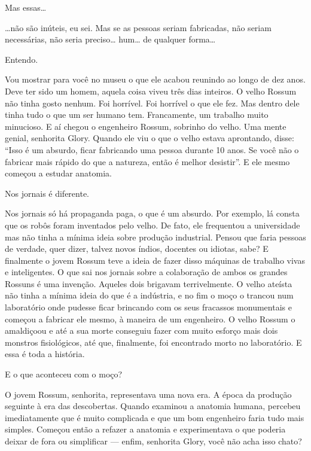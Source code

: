  Mas essas\ldots{}

 \ldots{}não são inúteis, eu sei. Mas se as pessoas seriam fabricadas, não
seriam necessárias, não seria preciso\ldots{} hum\ldots{} de qualquer forma\ldots{}

 Entendo.

 Vou mostrar para você no museu o que ele acabou reunindo ao longo de
dez anos. Deve ter sido um homem, aquela coisa viveu três dias inteiros. O velho
Rossum não tinha gosto nenhum. Foi horrível. Foi horrível o que ele fez. Mas
dentro dele tinha tudo o que um ser humano tem. Francamente, um trabalho
muito minucioso. E aí chegou o engenheiro Rossum, sobrinho do velho. Uma mente
genial, senhorita Glory. Quando ele viu o que o velho estava aprontando, disse:
``Isso é um absurdo, ficar fabricando uma pessoa durante 10 anos. Se você não o
fabricar mais rápido do que a natureza, então é melhor desistir''.
E ele mesmo começou a estudar anatomia.

 Nos jornais é diferente.

  Nos jornais só há propaganda paga, o que é um
absurdo. Por exemplo, lá consta que os robôs foram inventados pelo velho. De
fato, ele frequentou a universidade mas não tinha a mínima ideia sobre produção
industrial. Pensou que faria pessoas de verdade, quer dizer, talvez novos
índios, docentes ou idiotas, sabe? E finalmente o jovem Rossum teve a ideia de
fazer disso máquinas de trabalho vivas e inteligentes. O que sai nos
jornais sobre a colaboração de ambos os grandes Rossuns é uma invenção.
Aqueles dois brigavam terrivelmente. O velho ateísta não tinha a mínima ideia do
que é a indústria, e no fim o moço o trancou num laboratório onde pudesse ficar
brincando com os seus fracassos monumentais e começou a fabricar ele mesmo, à maneira de um
engenheiro. O velho Rossum o amaldiçoou e até a sua morte conseguiu fazer com
muito esforço mais dois monstros fisiológicos, até que, finalmente, foi
encontrado morto no laboratório. E essa é toda a história.

 E o que aconteceu com o moço?

 O jovem Rossum, senhorita, representava uma nova era. A época da produção
seguinte à era das descobertas. Quando examinou a anatomia humana, percebeu
imediatamente que é muito complicada e que um bom engenheiro faria tudo mais
simples. Começou então a refazer a anatomia e experimentava o que poderia deixar
de fora ou simplificar --- enfim, senhorita Glory, você não acha isso chato?

